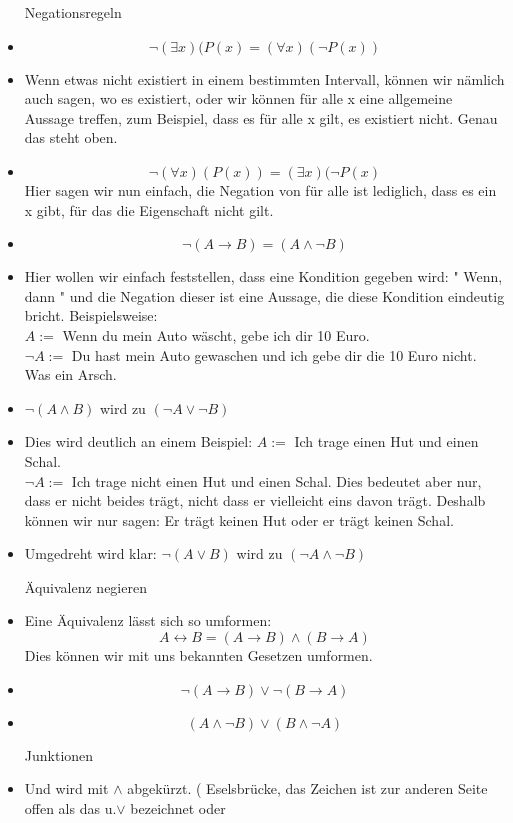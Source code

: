 \documentclass[smallheadings,headsepline,12pt,a4paper]{scrartcl}
\begin{document}
\begin{itemize}
\item[Negationsregeln]
\item $$ \neg(\exists x )(P(x) = (\forall x) (\neg P (x)) $$ 
\item Wenn etwas nicht existiert in einem bestimmten Intervall, können wir nämlich auch sagen, wo es existiert, oder wir können für alle x eine allgemeine Aussage treffen, zum Beispiel, dass es für alle x gilt, es existiert nicht. Genau das steht oben.
\item  $$ \neg  (\forall x) ( P (x)) = (\exists x )(\neg P(x)$$ Hier sagen wir nun einfach, die Negation von für alle ist lediglich, dass es ein x gibt, für das die Eigenschaft nicht gilt.
\item $$ \neg ( A \rightarrow B ) = ( A \wedge \neg B ) $$ 
\item Hier wollen wir einfach feststellen, dass eine Kondition gegeben wird: " Wenn, dann " und die Negation dieser ist eine Aussage, die diese Kondition eindeutig bricht. Beispielsweise: \\
$A:=$ Wenn du mein Auto wäscht, gebe ich dir 10 Euro. \\
$\neg A :=$ Du hast mein Auto gewaschen und ich gebe dir die 10 Euro nicht. Was ein Arsch. \\
\item $ \neg (A \wedge B ) $ wird zu $ (\neg A \lor \neg B ) $ \\
\item Dies wird deutlich an einem Beispiel: $A:=$ Ich trage einen Hut und einen Schal. \\
$\neg A:=$ Ich trage nicht einen Hut und einen Schal. Dies bedeutet aber nur, dass er nicht beides trägt, nicht dass er vielleicht eins davon trägt. Deshalb können wir nur sagen: Er trägt keinen Hut oder er trägt keinen Schal.
\item Umgedreht wird klar: $ \neg (A \lor B ) $ wird zu $ (\neg A \wedge \neg B ) $
\item[Äquivalenz negieren]
\item Eine Äquivalenz lässt sich so umformen: $$ A \leftrightarrow B =  ( A \rightarrow B ) \wedge ( B \rightarrow A ) $$
Dies können wir mit uns bekannten Gesetzen umformen.
\item $$ \neg ( A \rightarrow B ) \lor \neg ( B \rightarrow A ) $$
\item $$ ( A \wedge \neg B ) \lor ( B \wedge \neg A ) $$


\item[Junktionen]
\item  Und wird mit $\wedge$ abgekürzt. ( Eselsbrücke, das Zeichen ist zur anderen Seite offen als das u.$\lor$ bezeichnet oder \\


\end{itemize}
\end{document}
